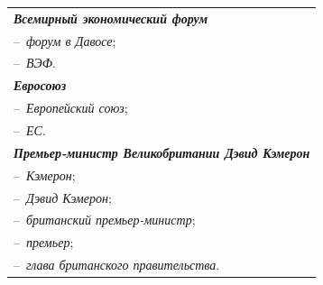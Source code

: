 \begin{table}[b]\small

\vspace*{-12pt}

\begin{center}

\parbox{270pt}{}



\vspace*{2ex}



\begin{tabular}{|l|}

\hline

{\bfseries\textit{Всемирный экономический форум}}\\

\hspace*{5mm}--~\textit{форум в Давосе};\\

\hspace*{5mm}--~\textit{ВЭФ}.\\

{\bfseries\textit{Евросоюз}}\\

\hspace*{5mm}--~\textit{Европейский союз};\\

\hspace*{5mm}--~\textit{ЕС}.\\

{\bfseries\textit{Премьер-министр Великобритании Дэвид Кэмерон}}\\ 

    \hspace*{5mm}--~\textit{Кэмерон};\\

    \hspace*{5mm}--~\textit{Дэвид Кэмерон};\\

    \hspace*{5mm}--~\textit{британский премьер-министр};\\

    \hspace*{5mm}--~\textit{премьер};\\

    \hspace*{5mm}--~\textit{глава британского правительства}.\\

    \hline

    \end{tabular}

    \end{center}

    \end{table}

